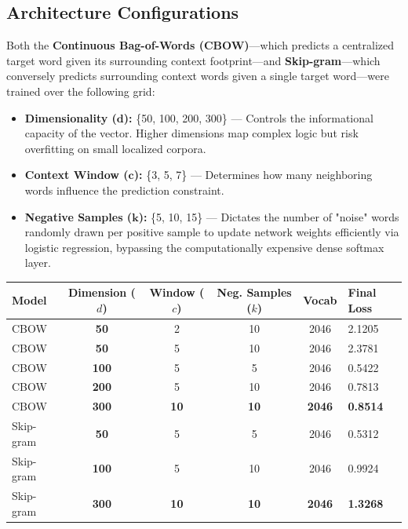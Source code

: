 \documentclass[11pt,a4paper]{article}
\begin{document}
\subsection{Architecture Configurations}
Both the \textbf{Continuous Bag-of-Words (CBOW)}—which predicts a centralized target word given its surrounding context footprint—and \textbf{Skip-gram}—which conversely predicts surrounding context words given a single target word—were trained over the following grid:

\begin{itemize}[label=\textcolor{iitjblue}{\textbullet}, itemsep=0.4em]
    \justifying
    \item \textbf{Dimensionality ($\boldsymbol{d}$):} \{50, 100, 200, 300\} — Controls the informational capacity of the vector. Higher dimensions map complex logic but risk overfitting on small localized corpora.
    \item \textbf{Context Window ($\boldsymbol{c}$):} \{3, 5, 7\} — Determines how many neighboring words influence the prediction constraint.
    \item \textbf{Negative Samples ($\boldsymbol{k}$):} \{5, 10, 15\} — Dictates the number of "noise" words randomly drawn per positive sample to update network weights efficiently via logistic regression, bypassing the computationally expensive dense softmax layer.
\end{itemize}

\begin{center}
\renewcommand{\arraystretch}{1.2}
\begin{tabular}{@{} l c c c c l @{}}
    \toprule
    \textbf{\color{iitjblue} Model} & \textbf{\color{iitjblue} Dimension ($d$)} & \textbf{\color{iitjblue} Window ($c$)} & \textbf{\color{iitjblue} Neg. Samples ($k$)} & \textbf{\color{iitjblue} Vocab} & \textbf{\color{iitjblue} Final Loss} \\
    \midrule
    CBOW & \textbf{50} & 2 & 10 & 2046 & 2.1205 \\
    CBOW & \textbf{50} & 5 & 10 & 2046 & 2.3781 \\
    CBOW & \textbf{100} & 5 & 5 & 2046 & 0.5422 \\
    CBOW & \textbf{200} & 5 & 10 & 2046 & 0.7813 \\
    \rowcolor{highlightbg}
    CBOW & \textbf{300} & \textbf{10} & \textbf{10} & \textbf{2046} & \textbf{0.8514} \\
    Skip-gram & \textbf{50} & 5 & 5 & 2046 & 0.5312 \\
    Skip-gram & \textbf{100} & 5 & 10 & 2046 & 0.9924 \\
    \rowcolor{highlightbg}
    Skip-gram & \textbf{300} & \textbf{10} & \textbf{10} & \textbf{2046} & \textbf{1.3268} \\
    \bottomrule
\end{tabular}
\end{center}
\end{document}
